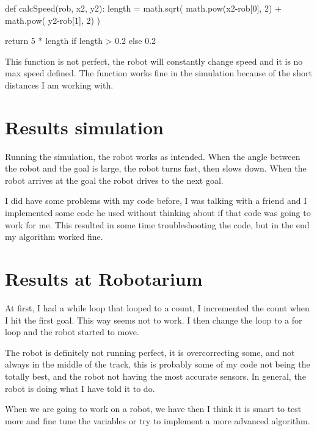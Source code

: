 \documentclass{article}
\begin{document}
        \begin{pythoncode}
    def calcSpeed(rob, x2, y2):
        length = math.sqrt( math.pow(x2-rob[0], 2) + 
            math.pow( y2-rob[1], 2) )

        return 5 * length if length > 0.2 else 0.2
        \end{pythoncode}

        This function is not perfect, the robot will constantly change speed and it is no max speed defined. The function works fine in the simulation because of the short distances I am working with.

    \section{Results simulation}
        Running the simulation, the robot works as intended. When the angle between the robot and the goal is large, the robot turns fast, then slows down. When the robot arrives at the goal the robot drives to the next goal. 
        
        I did have some problems with my code before, I was talking with a friend and I implemented some code he used without thinking about if that code was going to work for me. This resulted in some time troubleshooting the code, but in the end my algorithm worked fine.

    \section{Results at Robotarium}
        At first, I had a while loop that looped to a count, I incremented the count when I hit the first goal. This way seems not to work. I then change the loop to a for loop and the robot started to move.

        The robot is definitely not running perfect, it is overcorrecting some, and not always in the middle of the track, this is probably some of my code not being the totally best, and the robot not having the most accurate sensors. In general, the robot is doing what I have told it to do.

        When we are going to work on a robot, we have then I think it is smart to test more and fine tune the variables or try to implement a more advanced algorithm.
\end{document}
